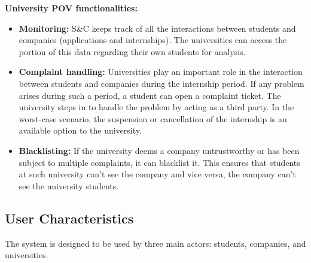 \par\textbf{University POV functionalities:}


\begin{itemize}
        \item \textbf{Monitoring:} S\&C keeps track of all the interactions between students and companies (applications and internships). The universities can access the portion of this data regarding their own students for analysis.
        \item \textbf{Complaint handling:} Universities play an important role in the interaction between students and companies during the internship period. If any problem arises during such a period, a student can open a complaint ticket. The university steps in to handle the problem by acting as a third party. In the worst-case scenario, the suspension or cancellation of the internship is an available option to the university.
        \item \textbf{Blacklisting:} If the university deems a company untrustworthy or has been subject to multiple complaints, it can blacklist it. This ensures that students at such university can’t see the company and vice versa, the company can’t see the university students. 
\end{itemize}

\subsection{User Characteristics}
\label{sub:user_characteristics}%

\par The system is designed to be used by three main actors: students, companies, and universities.

